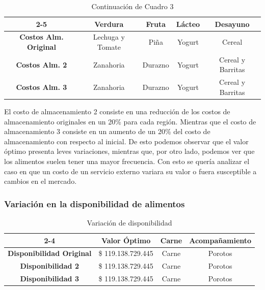 \documentclass[letterpaper]{article}
\begin{document}
\begin{table}[H]
\centering
\begin{tabular}{c|c|c|c|c|}
\cline{2-5}
 & \textbf{Verdura} & \textbf{Fruta} & \textbf{Lácteo} & \textbf{Desayuno} \\ \hline
\multicolumn{1}{|c|}{\textbf{Costos Alm. Original}} & Lechuga y Tomate & Piña & Yogurt & Cereal \\ \hline
\multicolumn{1}{|c|}{\textbf{Costos Alm. 2}} & Zanahoria & Durazno & Yogurt & Cereal y Barritas \\ \hline
\multicolumn{1}{|c|}{\textbf{Costos Alm. 3}} & Zanahoria & Durazno & Yogurt & Cereal y Barritas \\ \hline
\end{tabular}
\caption{Continuación de Cuadro 3}
\end{table}

El costo de almacenamiento 2 consiste en una reducción de los costos de almacenamiento originales en un 20\% para cada región. Mientras que el costo de almacenamiento 3 consiste en un aumento de un 20\% del costo de almacenamiento con respecto al inicial. De esto podemos observar que el valor óptimo presenta leves variaciones, mientras que, por otro lado, podemos ver que los alimentos suelen tener una mayor frecuencia. Con esto se quería analizar el caso en que un costo de un servicio externo variara su valor o fuera susceptible a cambios en el mercado. \\

\subsubsection{Variación en la disponibilidad de alimentos}

\begin{table}[H]
\centering
\begin{tabular}{c|c|c|c|}
\cline{2-4}
 & \textbf{Valor Óptimo} & \textbf{Carne} & \textbf{Acompañamiento} \\ \hline
\multicolumn{1}{|c|}{\textbf{Disponibilidad Original}} & \$ 119.138.729.445 & Carne & Porotos \\ \hline
\multicolumn{1}{|c|}{\textbf{Disponibilidad 2}} & \$ 119.138.729.445 & Carne & Porotos \\ \hline
\multicolumn{1}{|c|}{\textbf{Disponibilidad 3}} & \$ 119.138.729.445 & Carne & Porotos \\ \hline
\end{tabular}
\caption{Variación de disponibilidad}
\end{table}
\end{document}
